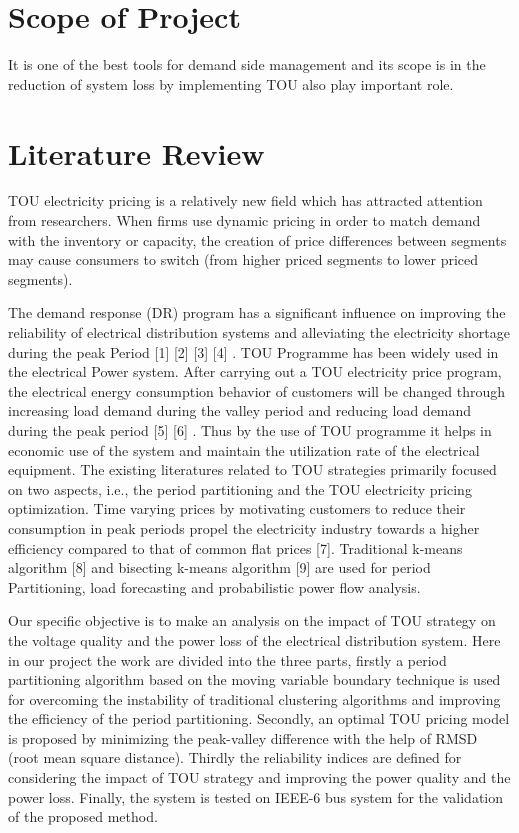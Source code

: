 \documentclass[14 pt]{article}
\begin{document}
\section{Scope of Project}
It is one of the best tools for demand side management and its scope is in the
reduction of system loss by implementing TOU also play important role.

\pagebreak
\section{Literature Review}
TOU electricity pricing is a relatively new field which has attracted attention from
researchers. When firms use dynamic pricing in order to match demand with the
inventory or capacity, the creation of price differences between segments may
cause consumers to switch (from higher priced segments to lower priced segments).


The demand response (DR) program has a significant influence on improving
the reliability of electrical distribution systems and alleviating the electricity shortage during the peak Period [1] [2] [3] [4] . TOU Programme has been widely used
in the electrical Power system. After carrying out a TOU electricity price program,
the electrical energy consumption behavior of customers will be changed through
increasing load demand during the valley period and reducing load demand during
the peak period [5] [6] . Thus by the use of TOU programme it helps in economic
use of the system and maintain the utilization rate of the electrical equipment. The
existing literatures related to TOU strategies primarily focused on two aspects,
i.e., the period partitioning and the TOU electricity pricing optimization. Time
varying prices by motivating customers to reduce their consumption in peak periods propel the electricity industry towards a higher efficiency compared to that of
common flat prices [7]. Traditional k-means algorithm [8] and bisecting k-means
algorithm [9] are used for period Partitioning, load forecasting and probabilistic
power flow analysis.


Our specific objective is to make an analysis on the impact of TOU strategy on
the voltage quality and the power loss of the electrical distribution system. Here in
our project the work are divided into the three parts, firstly a period partitioning algorithm based on the moving variable boundary technique is used for overcoming
the instability of traditional clustering algorithms and improving the efficiency of
the period partitioning. Secondly, an optimal TOU pricing model is proposed by
minimizing the peak-valley difference with the help of RMSD (root mean square
distance). Thirdly the reliability indices are defined for considering the impact of
TOU strategy and improving the power quality and the power loss. Finally, the
system is tested on IEEE-6 bus system for the validation of the proposed method.
\pagebreak
\end{document}
